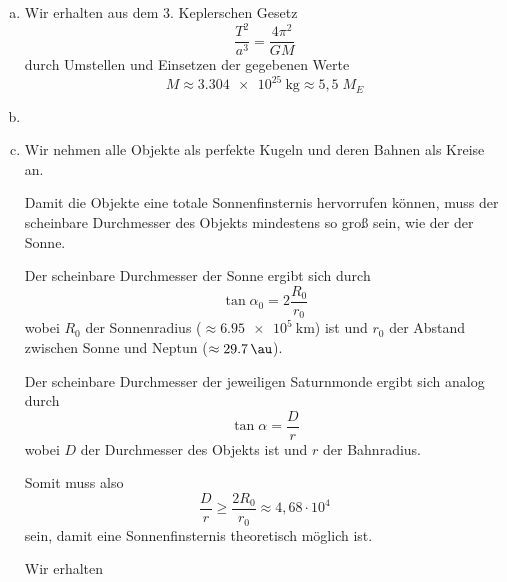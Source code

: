 \documentclass[a4paper,german,12pt,smallheadings]{scrartcl}
\begin{document}
\begin{enumerate}[a)]
  \item
    Wir erhalten aus dem 3. Keplerschen Gesetz
    \begin{equation}
      \frac{T^2}{a^3} = \frac{4 \pi^2}{G M}
    \end{equation}
    durch Umstellen und Einsetzen der gegebenen Werte
    \begin{equation}
      M \approx \SI{3.304e25}{\kilogram} \approx 5{,}5 \; M_E
    \end{equation}
  \item
  \item
    Wir nehmen alle Objekte als perfekte Kugeln und deren Bahnen als Kreise an.

    Damit die Objekte eine totale Sonnenfinsternis hervorrufen können, muss der
    scheinbare Durchmesser des Objekts mindestens so groß sein, wie der der
    Sonne.

    Der scheinbare Durchmesser der Sonne ergibt sich durch
    \begin{equation}
      \tan \alpha_0 = 2 \frac{R_0}{r_0}
    \end{equation}
    wobei $R_0$ der Sonnenradius ($\approx \SI{6.95e5}{\kilo\meter}$) ist und $r_0$
    der Abstand zwischen Sonne und Neptun ($\approx \SI{29.7}{\au}$).

    Der scheinbare Durchmesser der jeweiligen Saturnmonde ergibt sich analog
    durch
    \begin{equation}
      \tan \alpha = \frac{D}{r}
    \end{equation}
    wobei $D$ der Durchmesser des Objekts ist und $r$ der Bahnradius.

    Somit muss also
    \begin{equation}
      \frac{D}{r} \ge \frac{2R_0}{r_0} \approx 4{,}68 \cdot 10^{4}
    \end{equation}
    sein, damit eine Sonnenfinsternis theoretisch möglich ist.

    Wir erhalten


\end{enumerate}
\end{document}
